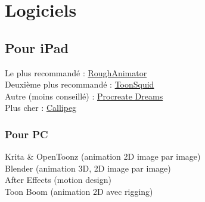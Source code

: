 \documentclass[12pt]{article}
\begin{document}
\section*{Logiciels}
\subsection*{Pour iPad}
Le plus recommandé : \href{https://www.roughanimator.com/}{RoughAnimator}\\
Deuxième plus recommandé : \href{https://apps.apple.com/us/app/toonsquid/id1573778812}{ToonSquid}\\
Autre (moins conseillé) : \href{https://procreate.com/dreams}{Procreate Dreams}\\
Plus cher : \href{https://callipeg.com}{Callipeg}\\
\subsubsection*{Pour PC}
Krita \& OpenToonz (animation 2D image par image)\\
Blender (animation 3D, 2D image par image)\\
After Effects (motion design)\\
Toon Boom (animation 2D avec rigging)\\
\end{document}

